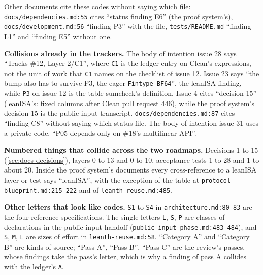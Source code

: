 \begin{sloppypar}
Other documents cite these codes without saying which file: \texttt{docs/\allowbreak{}dependencies.\allowbreak{}md:\allowbreak{}55} cites ``status finding E6'' (the proof system's), \texttt{docs/\allowbreak{}development.\allowbreak{}md:\allowbreak{}56} ``finding P3'' with the file, \texttt{tests/\allowbreak{}README.\allowbreak{}md} ``finding L1'' and ``finding E5'' without one.
\end{sloppypar}

\begin{sloppypar}
\textbf{Collisions already in the trackers.} The body of intention issue 28 says ``Tracks \#12, Layer 2/C1'', where \texttt{C1} is the ledger entry on Clean's expressions, not the unit of work that \texttt{C1} names on the checklist of issue 12. Issue 23 says ``the bump also has to survive P3, the eager \texttt{Fintype BF64}'', the leanISA finding, while \texttt{P3} on issue 12 is the table sumcheck's definition. Issue 4 cites ``decision 15'' (leanISA's: fixed columns after Clean pull request 446), while the proof system's decision 15 is the public-input transcript. \texttt{docs/\allowbreak{}dependencies.\allowbreak{}md:\allowbreak{}87} cites ``finding C8'' without saying which status file. The body of intention issue 31 uses a private code, ``P05 depends only on \#18's multilinear API''.
\end{sloppypar}

\begin{sloppypar}
\textbf{Numbered things that collide across the two roadmaps.} Decisions 1 to 15 (\cref{sec:docs-decisions}), layers 0 to 13 and 0 to 10, acceptance tests 1 to 28 and 1 to about 20. Inside the proof system's documents every cross-reference to a leanISA layer or test says ``leanISA'', with the exception of the table at \texttt{protocol-\allowbreak{}blueprint.\allowbreak{}md:\allowbreak{}215-\allowbreak{}222} and of \texttt{leanth-\allowbreak{}reuse.\allowbreak{}md:\allowbreak{}485}.
\end{sloppypar}

\begin{sloppypar}
\textbf{Other letters that look like codes.} \texttt{S1} to \texttt{S4} in \texttt{architecture.\allowbreak{}md:\allowbreak{}80-\allowbreak{}83} are the four reference specifications. The single letters \texttt{L}, \texttt{S}, \texttt{P} are classes of declarations in the public-input handoff (\texttt{public-\allowbreak{}input-\allowbreak{}phase.\allowbreak{}md:\allowbreak{}483-\allowbreak{}484}), and \texttt{S}, \texttt{M}, \texttt{L} are sizes of effort in \texttt{leanth-\allowbreak{}reuse.\allowbreak{}md:\allowbreak{}58}. ``Category A'' and ``Category B'' are kinds of source; ``Pass A'', ``Pass B'', ``Pass C'' are the review's passes, whose findings take the pass's letter, which is why a finding of pass A collides with the ledger's \texttt{A}.
\end{sloppypar}

